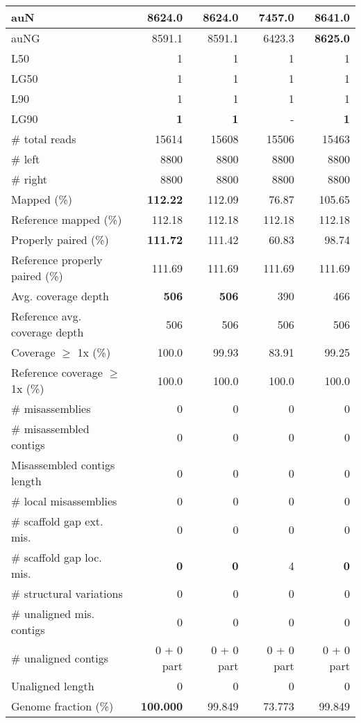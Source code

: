 \documentclass[12pt,a4paper]{article}
\begin{document}
\begin{table}[ht]
\begin{center}
\begin{tabular}{|l*{4}{|r}|}
auN & 8624.0 & 8624.0 & 7457.0 & {\bf 8641.0} \\ \hline
auNG & 8591.1 & 8591.1 & 6423.3 & {\bf 8625.0} \\ \hline
L50 & 1 & 1 & 1 & 1 \\ \hline
LG50 & 1 & 1 & 1 & 1 \\ \hline
L90 & 1 & 1 & 1 & 1 \\ \hline
LG90 & {\bf 1} & {\bf 1} & - & {\bf 1} \\ \hline
\# total reads & 15614 & 15608 & 15506 & 15463 \\ \hline
\# left & 8800 & 8800 & 8800 & 8800 \\ \hline
\# right & 8800 & 8800 & 8800 & 8800 \\ \hline
Mapped (\%) & {\bf 112.22} & 112.09 & 76.87 & 105.65 \\ \hline
Reference mapped (\%) & 112.18 & 112.18 & 112.18 & 112.18 \\ \hline
Properly paired (\%) & {\bf 111.72} & 111.42 & 60.83 & 98.74 \\ \hline
Reference properly paired (\%) & 111.69 & 111.69 & 111.69 & 111.69 \\ \hline
Avg. coverage depth & {\bf 506} & {\bf 506} & 390 & 466 \\ \hline
Reference avg. coverage depth & 506 & 506 & 506 & 506 \\ \hline
Coverage $\geq$ 1x (\%) & 100.0 & 99.93 & 83.91 & 99.25 \\ \hline
Reference coverage $\geq$ 1x (\%) & 100.0 & 100.0 & 100.0 & 100.0 \\ \hline
\# misassemblies & 0 & 0 & 0 & 0 \\ \hline
\# misassembled contigs & 0 & 0 & 0 & 0 \\ \hline
Misassembled contigs length & 0 & 0 & 0 & 0 \\ \hline
\# local misassemblies & 0 & 0 & 0 & 0 \\ \hline
\# scaffold gap ext. mis. & 0 & 0 & 0 & 0 \\ \hline
\# scaffold gap loc. mis. & {\bf 0} & {\bf 0} & 4 & {\bf 0} \\ \hline
\# structural variations & 0 & 0 & 0 & 0 \\ \hline
\# unaligned mis. contigs & 0 & 0 & 0 & 0 \\ \hline
\# unaligned contigs & 0 + 0 part & 0 + 0 part & 0 + 0 part & 0 + 0 part \\ \hline
Unaligned length & 0 & 0 & 0 & 0 \\ \hline
Genome fraction (\%) & {\bf 100.000} & 99.849 & 73.773 & 99.849 \\ \hline

\end{tabular}
\end{center}
\end{table}
\end{document}

